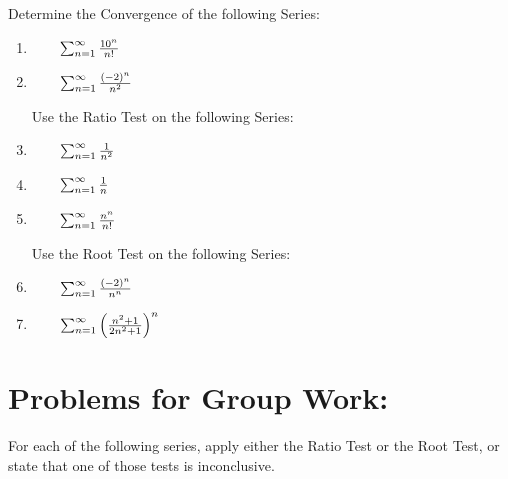 Determine the Convergence of the following Series:
\begin{enumerate}[{Example }1:]

\item  \(\qquad\sum_{n=1}^\infty \frac{10^n}{n!}\)
\vfill

\item  \(\qquad\sum_{n=1}^\infty \frac{(-2)^n}{n^2}\)
\vfill



\pagebreak

\hspace{-.75in} Use the Ratio Test on the following Series:

\item  \(\qquad\sum_{n=1}^\infty \frac{1}{n^2}\)
\vfill

\item  \(\qquad\sum_{n=1}^\infty \frac{1}{n}\)

\vfill

\item \(\qquad\sum_{n=1}^\infty	\frac{n^n}{n!}\)
\vfill

\hspace*{-.75in}Use the Root Test on the following Series:

\item  \(\qquad\sum_{n=1}^\infty \frac{(-2)^n}{n^n}\)

\vfill
\item \(\qquad\sum_{n=1}^\infty	\left(\frac{n^2+1}{2n^2+1}\right)^n\)
\vfill

\end{enumerate}


\pagebreak

\section*{Problems for Group Work:}

For each of the following series, apply either the Ratio Test or the Root Test, or state that one of those tests is inconclusive.


